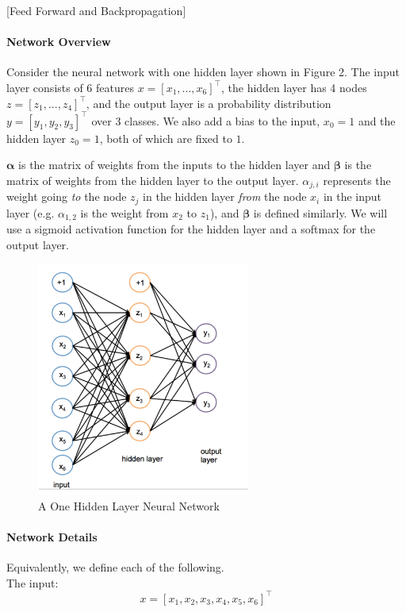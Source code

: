 \item {} [Feed Forward and Backpropagation]
\paragraph{Network Overview}
Consider the neural network with one hidden layer shown in Figure 2. The input layer consists of 6 features $x = [x_1,...,x_6]^{\top}$, the hidden layer has 4 nodes $z = [z_1,...,z_4]^{\top}$, and the output layer is a probability distribution $y = [y_1, y_2, y_3]^{\top}$ over 3 classes. We also add a bias to the input, $x_0 = 1$ and the hidden layer $z_0 = 1$, both of which are fixed to $1$.

$\boldsymbol{\alpha}$ is the matrix of weights from the inputs to the hidden layer and $\boldsymbol{\beta}$ is the matrix of weights from the hidden layer to the output layer.
$\alpha_{j,i}$ represents the weight going \textit{to} the node $z_j$ in the hidden layer \textit{from} the node $x_i$ in the input layer (e.g. $\alpha_{1,2}$ is the weight from $x_2$ to $z_1$), and $\boldsymbol{\beta}$ is defined similarly. We will use a sigmoid activation function for the hidden layer and a softmax for the output layer.

\begin{figure}[h]
    \centering
    \includegraphics[width=7cm]{figure/p5.png}
    \caption{A One Hidden Layer Neural Network}
\end{figure}
\paragraph{Network Details}

Equivalently, we define each of the following. \\
The input:
$$x=[x_1,x_2,x_3,x_4,x_5,x_6]^{\top}$$

